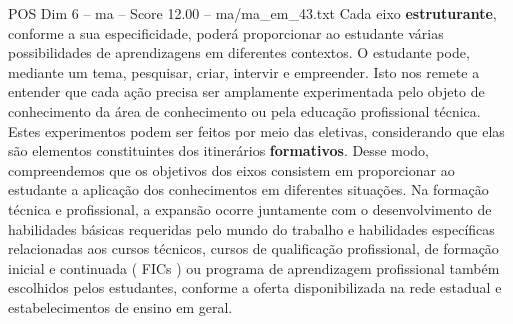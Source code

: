 \begin{textsample}{POS Dim 6 – ma – Score 12.00 – ma/ma\_em\_43.txt}
Cada eixo \textbf{estruturante}, conforme a sua especificidade, poderá proporcionar ao estudante várias possibilidades de aprendizagens em diferentes contextos.
O estudante pode, mediante um tema, pesquisar, criar, intervir e empreender.
Isto nos remete a entender que cada ação precisa ser amplamente experimentada pelo objeto de conhecimento da área de conhecimento ou pela educação profissional técnica.
Estes experimentos podem ser feitos por meio das eletivas, considerando que elas são elementos constituintes dos itinerários \textbf{formativos}.
Desse modo, compreendemos que os objetivos dos eixos consistem em proporcionar ao estudante a aplicação dos conhecimentos em diferentes situações.
Na formação técnica e profissional, a expansão ocorre juntamente com o desenvolvimento de habilidades básicas requeridas pelo mundo do trabalho e habilidades específicas relacionadas aos cursos técnicos, cursos de qualificação profissional, de formação inicial e continuada ( FICs ) ou programa de aprendizagem profissional também escolhidos pelos estudantes, conforme a oferta disponibilizada na rede estadual e estabelecimentos de ensino em geral.

\end{textsample}
